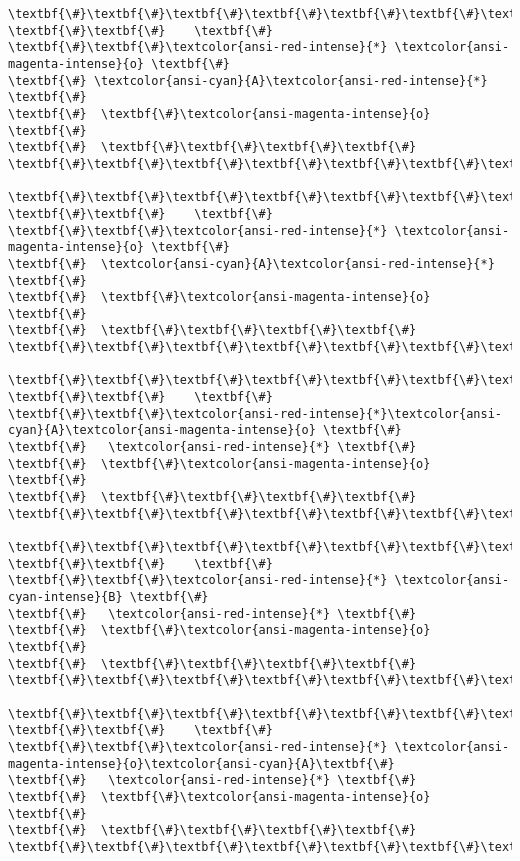 \documentclass[11pt]{article}
\begin{document}
\begin{Verbatim}[commandchars=\\\{\}]
\textbf{\#}\textbf{\#}\textbf{\#}\textbf{\#}\textbf{\#}\textbf{\#}\textbf{\#}
\textbf{\#}\textbf{\#}    \textbf{\#}
\textbf{\#}\textbf{\#}\textcolor{ansi-red-intense}{*} \textcolor{ansi-magenta-intense}{o} \textbf{\#}
\textbf{\#} \textcolor{ansi-cyan}{A}\textcolor{ansi-red-intense}{*}  \textbf{\#}
\textbf{\#}  \textbf{\#}\textcolor{ansi-magenta-intense}{o} \textbf{\#}
\textbf{\#}  \textbf{\#}\textbf{\#}\textbf{\#}\textbf{\#}
\textbf{\#}\textbf{\#}\textbf{\#}\textbf{\#}\textbf{\#}\textbf{\#}\textbf{\#}

\textbf{\#}\textbf{\#}\textbf{\#}\textbf{\#}\textbf{\#}\textbf{\#}\textbf{\#}
\textbf{\#}\textbf{\#}    \textbf{\#}
\textbf{\#}\textbf{\#}\textcolor{ansi-red-intense}{*} \textcolor{ansi-magenta-intense}{o} \textbf{\#}
\textbf{\#}  \textcolor{ansi-cyan}{A}\textcolor{ansi-red-intense}{*} \textbf{\#}
\textbf{\#}  \textbf{\#}\textcolor{ansi-magenta-intense}{o} \textbf{\#}
\textbf{\#}  \textbf{\#}\textbf{\#}\textbf{\#}\textbf{\#}
\textbf{\#}\textbf{\#}\textbf{\#}\textbf{\#}\textbf{\#}\textbf{\#}\textbf{\#}

\textbf{\#}\textbf{\#}\textbf{\#}\textbf{\#}\textbf{\#}\textbf{\#}\textbf{\#}
\textbf{\#}\textbf{\#}    \textbf{\#}
\textbf{\#}\textbf{\#}\textcolor{ansi-red-intense}{*}\textcolor{ansi-cyan}{A}\textcolor{ansi-magenta-intense}{o} \textbf{\#}
\textbf{\#}   \textcolor{ansi-red-intense}{*} \textbf{\#}
\textbf{\#}  \textbf{\#}\textcolor{ansi-magenta-intense}{o} \textbf{\#}
\textbf{\#}  \textbf{\#}\textbf{\#}\textbf{\#}\textbf{\#}
\textbf{\#}\textbf{\#}\textbf{\#}\textbf{\#}\textbf{\#}\textbf{\#}\textbf{\#}

\textbf{\#}\textbf{\#}\textbf{\#}\textbf{\#}\textbf{\#}\textbf{\#}\textbf{\#}
\textbf{\#}\textbf{\#}    \textbf{\#}
\textbf{\#}\textbf{\#}\textcolor{ansi-red-intense}{*} \textcolor{ansi-cyan-intense}{B} \textbf{\#}
\textbf{\#}   \textcolor{ansi-red-intense}{*} \textbf{\#}
\textbf{\#}  \textbf{\#}\textcolor{ansi-magenta-intense}{o} \textbf{\#}
\textbf{\#}  \textbf{\#}\textbf{\#}\textbf{\#}\textbf{\#}
\textbf{\#}\textbf{\#}\textbf{\#}\textbf{\#}\textbf{\#}\textbf{\#}\textbf{\#}

\textbf{\#}\textbf{\#}\textbf{\#}\textbf{\#}\textbf{\#}\textbf{\#}\textbf{\#}
\textbf{\#}\textbf{\#}    \textbf{\#}
\textbf{\#}\textbf{\#}\textcolor{ansi-red-intense}{*} \textcolor{ansi-magenta-intense}{o}\textcolor{ansi-cyan}{A}\textbf{\#}
\textbf{\#}   \textcolor{ansi-red-intense}{*} \textbf{\#}
\textbf{\#}  \textbf{\#}\textcolor{ansi-magenta-intense}{o} \textbf{\#}
\textbf{\#}  \textbf{\#}\textbf{\#}\textbf{\#}\textbf{\#}
\textbf{\#}\textbf{\#}\textbf{\#}\textbf{\#}\textbf{\#}\textbf{\#}\textbf{\#}


\end{Verbatim}
\end{document}
